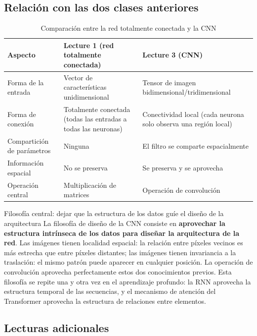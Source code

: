 \subsection{Relación con las dos clases anteriores}

\begin{table}[H]
\centering
\begin{tabular}{p{3cm}p{5cm}p{5cm}}
\toprule
\textbf{Aspecto} & \textbf{Lecture 1 (red totalmente conectada)} & \textbf{Lecture 3 (CNN)} \\
\midrule
Forma de la entrada & Vector de características unidimensional & Tensor de imagen bidimensional/tridimensional \\
Forma de conexión & Totalmente conectada (todas las entradas a todas las neuronas) & Conectividad local (cada neurona solo observa una región local) \\
Compartición de parámetros & Ninguna & El filtro se comparte espacialmente \\
Información espacial & No se preserva & Se preserva y se aprovecha \\
Operación central & Multiplicación de matrices & Operación de convolución \\
\bottomrule
\end{tabular}
\caption{Comparación entre la red totalmente conectada y la CNN}
\end{table}

\begin{importantbox}{Filosofía central: dejar que la estructura de los datos guíe el diseño de la arquitectura}
La filosofía de diseño de la CNN consiste en \textbf{aprovechar la estructura intrínseca de los datos para diseñar la arquitectura de la red}. Las imágenes tienen localidad espacial: la relación entre píxeles vecinos es más estrecha que entre píxeles distantes; las imágenes tienen invariancia a la traslación: el mismo patrón puede aparecer en cualquier posición. La operación de convolución aprovecha perfectamente estos dos conocimientos previos. Esta filosofía se repite una y otra vez en el aprendizaje profundo: la RNN aprovecha la estructura temporal de las secuencias, y el mecanismo de atención del Transformer aprovecha la estructura de relaciones entre elementos.
\end{importantbox}

\subsection{Lecturas adicionales}

